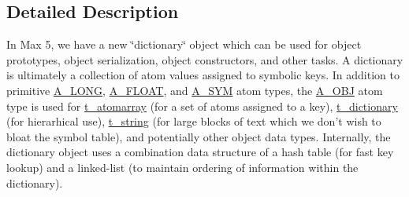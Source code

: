 \subsection{Detailed Description}
In Max 5, we have a new \char`\"{}dictionary\char`\"{} object which can be used for object prototypes, object serialization, object constructors, and other tasks. A dictionary is ultimately a collection of atom values assigned to symbolic keys. In addition to primitive \hyperlink{group__atom_gga8aa6700e9f00b132eb376db6e39ade47a002f28879581a6f66ea492b994b96f1e}{A\_\-LONG}, \hyperlink{group__atom_gga8aa6700e9f00b132eb376db6e39ade47a0b3aa0ab8104573dfc9cb70b5b08031f}{A\_\-FLOAT}, and \hyperlink{group__atom_gga8aa6700e9f00b132eb376db6e39ade47a2d661c2a5d949566e2f1944c99bceeea}{A\_\-SYM} atom types, the \hyperlink{group__atom_gga8aa6700e9f00b132eb376db6e39ade47a82cc76e0d53c8fc28df167c35d5bbd1a}{A\_\-OBJ} atom type is used for \hyperlink{structt__atomarray}{t\_\-atomarray} (for a set of atoms assigned to a key), \hyperlink{structt__dictionary}{t\_\-dictionary} (for hierarhical use), \hyperlink{structt__string}{t\_\-string} (for large blocks of text which we don't wish to bloat the symbol table), and potentially other object data types. Internally, the dictionary object uses a combination data structure of a hash table (for fast key lookup) and a linked-\/list (to maintain ordering of information within the dictionary).

